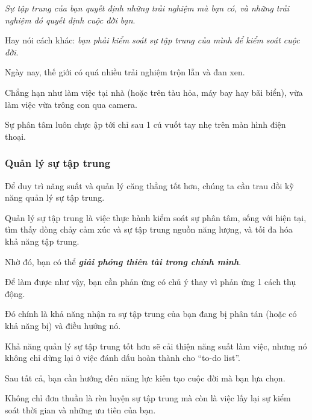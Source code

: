 \documentclass{article}
\begin{document}
%
\textit{Sự tập trung của bạn quyết định những trải nghiệm mà bạn có, và những trải nghiệm đó quyết định cuộc đời bạn}.

Hay nói cách khác: \textit{bạn phải kiểm soát sự tập trung của mình để kiểm soát cuộc đời}.

Ngày nay, thế giới có quá nhiều trải nghiệm trộn lẫn và đan xen.

Chẳng hạn như làm việc tại nhà (hoặc trên tàu hỏa, máy bay hay bãi biển), vừa làm việc vừa trông con qua camera.

Sự phân tâm luôn chực ập tới chỉ sau 1 cú vuốt tay nhẹ trên màn hình điện thoại.

\subsubsection{Quản lý sự tập trung}
Để duy trì năng suất và quản lý căng thẳng tốt hơn, chúng ta cần trau dồi kỹ năng quản lý sự tập trung.

%
Quản lý sự tập trung là việc thực hành kiểm soát sự phân tâm, sống với hiện tại, tìm thấy dòng chảy cảm xúc và sự tập trung nguồn năng lượng, và tối đa hóa khả năng tập trung.

Nhờ đó, bạn có thể \textbf{\textit{giải phóng thiên tài trong chính mình}}.

Để làm được như vậy, bạn cần phản ứng có chủ ý thay vì phản ứng 1 cách thụ động.

Đó chính là khả năng nhận ra sự tập trung của bạn đang bị phân tán (hoặc có khả năng bị) và điều hướng nó.

%
Khả năng quản lý sự tập trung tốt hơn sẽ cải thiện năng suất làm việc, nhưng nó không chỉ dừng lại ở việc đánh dấu hoàn thành cho ``to-do list''.

Sau tất cả, bạn cần hướng đến năng lực kiến tạo cuộc đời mà bạn lựa chọn.

Không chỉ đơn thuần là rèn luyện sự tập trung mà còn là việc lấy lại sự kiểm soát thời gian và những ưu tiên của bạn.
\end{document}
